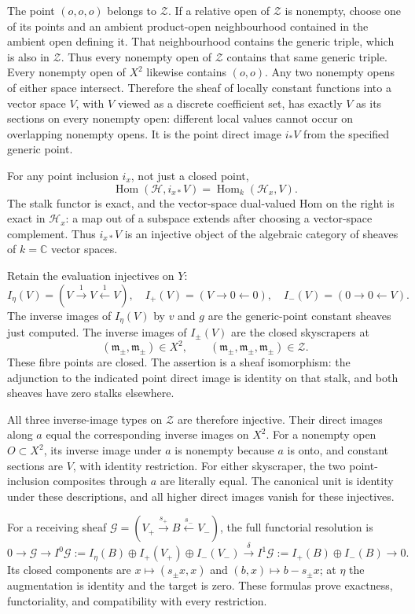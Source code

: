 The point \((o,o,o)\) belongs to \(\mathcal Z\). If a relative open of
\(\mathcal Z\) is nonempty, choose one of its points and an ambient
product-open neighbourhood contained in the ambient open defining it.
That neighbourhood contains the generic triple, which is also in
\(\mathcal Z\). Thus every nonempty open of \(\mathcal Z\) contains that
same generic triple. Every nonempty open of \(X^2\) likewise contains
\((o,o)\). Any two nonempty opens of either space intersect. Therefore
the sheaf of locally constant functions into a vector space \(V\), with
\(V\) viewed as a discrete coefficient set, has exactly \(V\) as its
sections on every nonempty open: different local values cannot occur on
overlapping nonempty opens. It is the point direct image \(i_*V\) from
the specified generic point.

For any point inclusion \(i_x\), not just a closed point, \[
\operatorname{Hom}(\mathcal H,i_{x*}V)
=\operatorname{Hom}_k(\mathcal H_x,V).
\] The stalk functor is exact, and the vector-space dual-valued Hom on
the right is exact in \(\mathcal H_x\): a map out of a subspace extends
after choosing a vector-space complement. Thus \(i_{x*}V\) is an
injective object of the algebraic category of sheaves of \(k=\mathbb C\)
vector spaces.

Retain the evaluation injectives on \(Y\): \[
I_\eta(V)=(V\xrightarrow1V\xleftarrow1V),\quad
I_+(V)=(V\to0\leftarrow0),\quad
I_-(V)=(0\to0\leftarrow V).
\] The inverse images of \(I_\eta(V)\) by \(v\) and \(g\) are the
generic-point constant sheaves just computed. The inverse images of
\(I_\pm(V)\) are the closed skyscrapers at \[
(\mathfrak m_\pm,\mathfrak m_\pm)\in X^2,\qquad
(\mathfrak m_\pm,\mathfrak m_\pm,\mathfrak m_\pm)\in\mathcal Z.
\] These fibre points are closed. The assertion is a sheaf isomorphism:
the adjunction to the indicated point direct image is identity on that
stalk, and both sheaves have zero stalks elsewhere.

All three inverse-image types on \(\mathcal Z\) are therefore injective.
Their direct images along \(a\) equal the corresponding inverse images
on \(X^2\). For a nonempty open \(O\subset X^2\), its inverse image
under \(a\) is nonempty because \(a\) is onto, and constant sections are
\(V\), with identity restriction. For either skyscraper, the two
point-inclusion composites through \(a\) are literally equal. The
canonical unit is identity under these descriptions, and all higher
direct images vanish for these injectives.

For a receiving sheaf
\(\mathcal G=(V_+\xrightarrow{s_+}B\xleftarrow{s_-}V_-)\), the full
functorial resolution is \[
0\to\mathcal G\to
I^0\mathcal G:=I_\eta(B)\oplus I_+(V_+)\oplus I_-(V_-)
\xrightarrow{\delta}
I^1\mathcal G:=I_+(B)\oplus I_-(B)\to0.
\tag{FEM1.1}
\] Its closed components are \(x\mapsto(s_\pm x,x)\) and
\((b,x)\mapsto b-s_\pm x\); at \(\eta\) the augmentation is identity and
the target is zero. These formulas prove exactness, functoriality, and
compatibility with every restriction.

